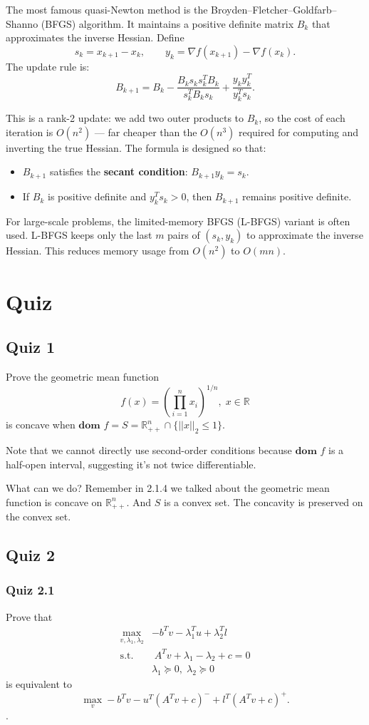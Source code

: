 \documentclass[lang=en,color=blue,mode=fancy,titlestyle=hang]{elegantbook}
\begin{document}
The most famous quasi-Newton method is the Broyden–Fletcher–Goldfarb–Shanno (BFGS) algorithm.
It maintains a positive definite matrix $B_k$ that approximates the inverse Hessian. Define
\[
s_k = x_{k+1} - x_k, \qquad y_k = \nabla f(x_{k+1}) - \nabla f(x_k).
\]
The update rule is:
\[
B_{k+1} = B_k - \frac{B_k s_k s_k^T B_k}{s_k^T B_k s_k} + \frac{y_k y_k^T}{y_k^T s_k}.
\]

This is a rank-2 update: we add two outer products to $B_k$, so the cost of each iteration
is $O(n^2)$ — far cheaper than the $O(n^3)$ required for computing and inverting the true Hessian.
The formula is designed so that:
\begin{itemize}
  \item $B_{k+1}$ satisfies the \textbf{secant condition}: $B_{k+1} y_k = s_k$.
  \item If $B_k$ is positive definite and $y_k^T s_k > 0$, then $B_{k+1}$ remains positive definite.
\end{itemize}

For large-scale problems, the limited-memory BFGS (L-BFGS) variant is often used. L-BFGS keeps only
the last $m$ pairs of $(s_k, y_k)$ to approximate the inverse Hessian. This reduces memory usage
from $O(n^2)$ to $O(mn)$.


\newpage
\appendix
\chapter{Quiz}
\section{Quiz 1}
Prove the geometric mean function
\[
f(x) = (\prod_{i = 1}^n x_i)^{1/n}, \; x \in \mathbb{R}
\]
is concave when $\textbf{dom } f = S = \mathbb{R}^n_{++} \cap \{ ||x||_2 \leq 1 \}$.

Note that we cannot directly use second-order conditions because $\textbf{dom } f$ is a
half-open interval, suggesting it's not twice differentiable.

What can we do? Remember in 2.1.4 we talked about the geometric mean function is concave
on $\mathbb{R}^n_{++}$. And $S$ is a convex set. The concavity is preserved on the convex
set.

\section{Quiz 2}
\subsection{Quiz 2.1}
Prove that
\begin{align*}
\max_{v, \lambda_1, \lambda_2}& -b^T v - \lambda_1^T u + \lambda_2^T l\\
\text{s.t.}& \; A^T v + \lambda_1 - \lambda_2 + c = 0\\
&\lambda_1 \succeq 0, \; \lambda_2 \succeq 0
\end{align*}
is equivalent to
\[
\max_{v} -b^T v - u^T (A^T v + c)^- + l^T (A^T v + c)^+.
\].
\end{document}

